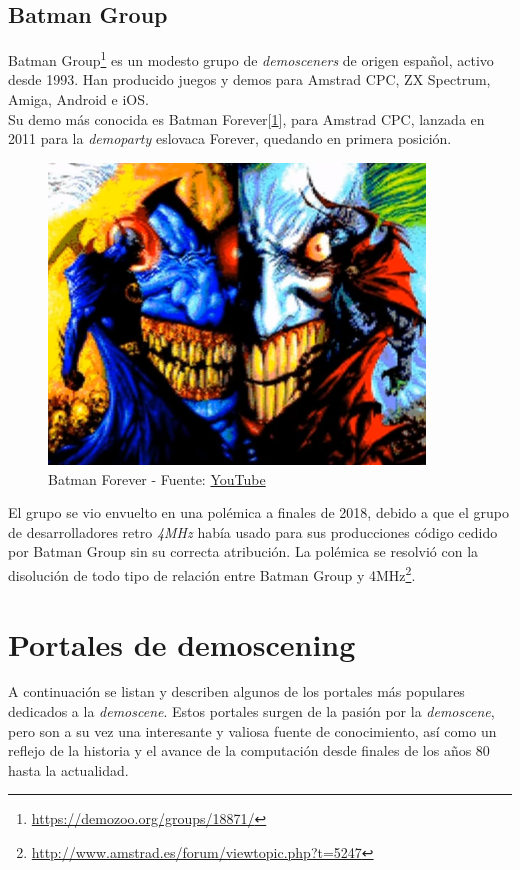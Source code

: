\subsection{Batman Group}

Batman Group\footnote{\url{https://demozoo.org/groups/18871/}} es un modesto grupo de \emph{demosceners} de origen español, activo desde 1993. Han producido juegos y demos para Amstrad CPC, ZX Spectrum, Amiga, Android e iOS.\\

Su demo más conocida es Batman Forever[\ref{fig:batmanforever}], para Amstrad CPC, lanzada en 2011 para la \emph{demoparty} eslovaca Forever, quedando en primera posición.\\

\begin{figure}[h]
	\centering
	\includegraphics[width=10cm]{archivos/batmanforever}
	\caption{Batman Forever - Fuente: \href{https://www.youtube.com/watch?v=dqjZNnjNu3Y}{YouTube}}
	\label{fig:batmanforever}
\end{figure}

El grupo se vio envuelto en una polémica a finales de 2018, debido a que el grupo de desarrolladores retro \emph{4MHz} había usado para sus producciones código cedido por Batman Group sin su correcta atribución. La polémica se resolvió con la disolución de todo tipo de relación entre Batman Group y 4MHz\footnote{\url{http://www.amstrad.es/forum/viewtopic.php?t=5247}}.

\section{Portales de demoscening}

A continuación se listan y describen algunos de los portales más populares dedicados a la \emph{demoscene}. Estos portales surgen de la pasión por la \emph{demoscene}, pero son a su vez una interesante y valiosa fuente de conocimiento, así como un reflejo de la historia y el avance de la computación desde finales de los años 80 hasta la actualidad.

